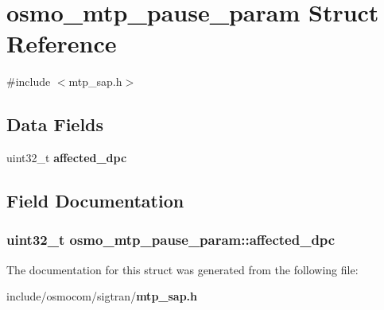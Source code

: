 \section{osmo\+\_\+mtp\+\_\+pause\+\_\+param Struct Reference}
\label{structosmo__mtp__pause__param}


{\ttfamily \#include $<$mtp\+\_\+sap.\+h$>$}

\subsection*{Data Fields}
\begin{DoxyCompactItemize}
\item 
uint32\+\_\+t {\bf affected\+\_\+dpc}
\end{DoxyCompactItemize}


\subsection{Field Documentation}
\subsubsection[{affected\+\_\+dpc}]{\setlength{\rightskip}{0pt plus 5cm}uint32\+\_\+t osmo\+\_\+mtp\+\_\+pause\+\_\+param\+::affected\+\_\+dpc}\label{structosmo__mtp__pause__param_a3c95fd6562612449571bf557828b5c90}


The documentation for this struct was generated from the following file\+:\begin{DoxyCompactItemize}
\item 
include/osmocom/sigtran/{\bf mtp\+\_\+sap.\+h}\end{DoxyCompactItemize}
